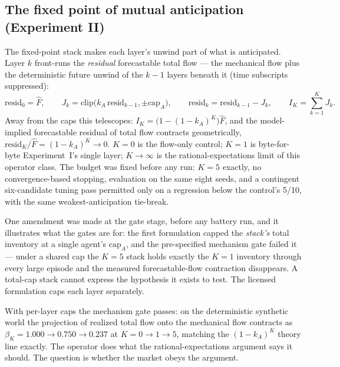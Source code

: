 \documentclass[11pt]{article}
\begin{document}
\subsection{The fixed point of mutual anticipation (Experiment II)}
\label{sec:model:stack}

The fixed-point stack makes each layer's unwind part of what is anticipated.
Layer $k$ front-runs the \emph{residual} forecastable total flow --- the
mechanical flow plus the deterministic future unwind of the $k-1$ layers
beneath it (time subscripts suppressed):
%
\begin{equation}
\mathrm{resid}_0 = \hat F, \qquad
J_k = \mathrm{clip}\bigl(k_A\,\mathrm{resid}_{k-1}, \pm \mathrm{cap}_A\bigr), \qquad
\mathrm{resid}_k = \mathrm{resid}_{k-1} - J_k, \qquad
I_K = \textstyle\sum_{k=1}^{K} J_k .
\label{eq:stack}
\end{equation}
%
Away from the caps this telescopes: $I_K = \bigl(1-(1-k_A)^K\bigr)\hat F$, and
the model-implied forecastable residual of total flow contracts geometrically,
$\mathrm{resid}_K/\hat F = (1-k_A)^K \to 0$. $K=0$ is the flow-only control;
$K=1$ is byte-for-byte Experiment~I's single layer; $K \to \infty$ is the
rational-expectations limit of this operator class. The budget was fixed
before any run: $K = 5$ exactly, no convergence-based stopping, evaluation on
the same eight seeds, and a contingent six-candidate tuning pass permitted
only on a regression below the control's 5/10, with the same
weakest-anticipation tie-break.

One amendment was made at the gate stage, before any battery run, and it
illustrates what the gates are for: the first formulation capped the
\emph{stack's} total inventory at a single agent's $\mathrm{cap}_A$, and the
pre-specified mechanism gate failed it --- under a shared cap the $K{=}5$ stack
holds exactly the $K{=}1$ inventory through every large episode and the
measured forecastable-flow contraction disappears. A total-cap stack cannot
express the hypothesis it exists to test. The licensed formulation caps each
layer separately.

With per-layer caps the mechanism gate passes: on the deterministic synthetic
world the projection of realized total flow onto the mechanical flow contracts
as
$\beta_K = 1.000 \to 0.750 \to 0.237$ at $K = 0 \to 1 \to 5$, matching the
$(1-k_A)^K$ theory line exactly. The operator does what the
rational-expectations argument says it should. The question is whether the
market obeys the argument.
\end{document}
